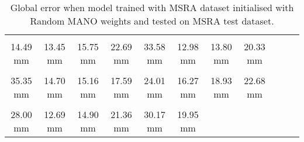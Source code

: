 \begin{table}[!ht]
    \begin{tabular}{|c|c|c|c|c|c|c|c|c|c|c|}
    \hline
    \cellcolor[HTML]{40ff00}{\bfseries Wrist} & \cellcolor[HTML]{40ff00}{\bfseries IMCP} & \cellcolor[HTML]{40ff00}{\bfseries IPIP} & \cellcolor[HTML]{80ff00}{\bfseries IDIP} & \cellcolor[HTML]{bfff00}{\bfseries ITIP} & \cellcolor[HTML]{40ff00}{\bfseries MMCP} & \cellcolor[HTML]{40ff00}{\bfseries MPIP} & \cellcolor[HTML]{80ff00}{\bfseries MDIP}  \\
    \cellcolor[HTML]{40ff00}$\,\,\,$14.49 mm & \cellcolor[HTML]{40ff00}$\,\,\,$13.45 mm & \cellcolor[HTML]{40ff00}$\,\,\,$15.75 mm & \cellcolor[HTML]{80ff00}$\,\,\,$22.69 mm & \cellcolor[HTML]{bfff00}$\,\,\,$33.58 mm & \cellcolor[HTML]{40ff00}$\,\,\,$12.98 mm & \cellcolor[HTML]{40ff00}$\,\,\,$13.80 mm & \cellcolor[HTML]{80ff00}$\,\,\,$20.33 mm\\
    \hline
    \cellcolor[HTML]{bfff00}{\bfseries MTIP} & \cellcolor[HTML]{40ff00}{\bfseries RMCP} & \cellcolor[HTML]{40ff00}{\bfseries RPIP} & \cellcolor[HTML]{40ff00}{\bfseries RDIP} & \cellcolor[HTML]{80ff00}{\bfseries RTIP} & \cellcolor[HTML]{40ff00}{\bfseries PMCP} & \cellcolor[HTML]{40ff00}{\bfseries PPIP} & \cellcolor[HTML]{80ff00}{\bfseries PDIP}  \\
    \cellcolor[HTML]{bfff00}$\,\,\,$35.35 mm & \cellcolor[HTML]{40ff00}$\,\,\,$14.70 mm & \cellcolor[HTML]{40ff00}$\,\,\,$15.16 mm & \cellcolor[HTML]{40ff00}$\,\,\,$17.59 mm & \cellcolor[HTML]{80ff00}$\,\,\,$24.01 mm & \cellcolor[HTML]{40ff00}$\,\,\,$16.27 mm & \cellcolor[HTML]{40ff00}$\,\,\,$18.93 mm & \cellcolor[HTML]{80ff00}$\,\,\,$22.68 mm\\
    \hline
    \cellcolor[HTML]{80ff00}{\bfseries PTIP} & \cellcolor[HTML]{40ff00}{\bfseries TMCP} & \cellcolor[HTML]{40ff00}{\bfseries TPIP} & \cellcolor[HTML]{80ff00}{\bfseries PDIP} & \cellcolor[HTML]{bfff00}{\bfseries TTIP} & \cellcolor[HTML]{40ff00}{\bfseries Average}  \\
    \cellcolor[HTML]{80ff00}$\,\,\,$28.00 mm & \cellcolor[HTML]{40ff00}$\,\,\,$12.69 mm & \cellcolor[HTML]{40ff00}$\,\,\,$14.90 mm & \cellcolor[HTML]{80ff00}$\,\,\,$21.36 mm & \cellcolor[HTML]{bfff00}$\,\,\,$30.17 mm & \cellcolor[HTML]{40ff00}$\,\,\,$19.95 mm \\
    \cline{1-6}
    \end{tabular}
    \caption{Global error when model trained with MSRA dataset initialised with Random MANO weights and tested on MSRA test dataset.}
    \label{}
    \end{table}
